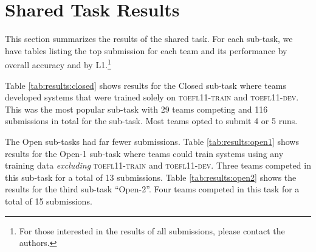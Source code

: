 \documentclass[11pt,letterpaper]{article}
\begin{document}
\section{Shared Task Results}
\label{sec-results}


This section summarizes the results of the shared task.  For each sub-task,
we have tables listing the top submission for each team and its performance by overall
accuracy and by L1.\footnote{For those interested in
the results of all submissions, please contact the authors.}

Table \ref{tab:results:closed} shows results for the Closed sub-task where teams
developed systems that were trained solely on \textsc{toefl11-train} and \textsc{toefl11-dev}.  This
was the most popular sub-task with 29 teams competing and 116 submissions in total
for the sub-task.  Most teams opted to submit 4 or 5 runs.



The Open sub-tasks had far fewer submissions.  Table \ref{tab:results:open1} shows
results for the Open-1 sub-task where teams could train systems using any training
data {\it excluding} \textsc{toefl11-train} and \textsc{toefl11-dev}.  Three teams competed in this
sub-task for a total of 13 submissions.  Table \ref{tab:results:open2} shows the results for the third sub-task ``Open-2''.  Four
teams competed in this task for a total of 15 submissions.
\end{document}

